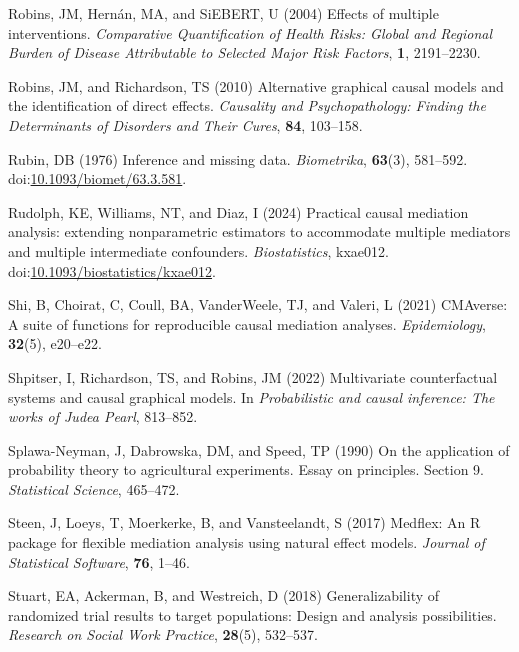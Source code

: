 \documentclass[
  single column]{article}
\newlength{\cslhangindent}
\newenvironment{CSLReferences}[2] %
 {\begin{list}{}{%
  \setlength{\itemindent}{0pt}
  \setlength{\leftmargin}{0pt}
  \setlength{\parsep}{0pt}
  \ifodd #1
   \setlength{\leftmargin}{\cslhangindent}
   \setlength{\itemindent}{-1\cslhangindent}
  \fi
  \setlength{\itemsep}{#2\baselineskip}}}
 {\end{list}}
\begin{document}
\begin{CSLReferences}{1}{0}
Robins, JM, Hernán, MA, and SiEBERT, U (2004) Effects of multiple
interventions. \emph{Comparative Quantification of Health Risks: Global
and Regional Burden of Disease Attributable to Selected Major Risk
Factors}, \textbf{1}, 2191--2230.

Robins, JM, and Richardson, TS (2010) Alternative graphical causal
models and the identification of direct effects. \emph{Causality and
Psychopathology: Finding the Determinants of Disorders and Their Cures},
\textbf{84}, 103--158.

Rubin, DB (1976) Inference and missing data. \emph{Biometrika},
\textbf{63}(3), 581--592.
doi:\href{https://doi.org/10.1093/biomet/63.3.581}{10.1093/biomet/63.3.581}.

Rudolph, KE, Williams, NT, and Diaz, I (2024) {Practical causal
mediation analysis: extending nonparametric estimators to accommodate
multiple mediators and multiple intermediate confounders}.
\emph{Biostatistics}, kxae012.
doi:\href{https://doi.org/10.1093/biostatistics/kxae012}{10.1093/biostatistics/kxae012}.

Shi, B, Choirat, C, Coull, BA, VanderWeele, TJ, and Valeri, L (2021)
CMAverse: A suite of functions for reproducible causal mediation
analyses. \emph{Epidemiology}, \textbf{32}(5), e20--e22.

Shpitser, I, Richardson, TS, and Robins, JM (2022) Multivariate
counterfactual systems and causal graphical models. In
\emph{Probabilistic and causal inference: The works of {J}udea {P}earl},
813--852.

Splawa-Neyman, J, Dabrowska, DM, and Speed, TP (1990) On the application
of probability theory to agricultural experiments. Essay on principles.
Section 9. \emph{Statistical Science}, 465--472.

Steen, J, Loeys, T, Moerkerke, B, and Vansteelandt, S (2017) Medflex: An
{R} package for flexible mediation analysis using natural effect models.
\emph{Journal of Statistical Software}, \textbf{76}, 1--46.

Stuart, EA, Ackerman, B, and Westreich, D (2018) Generalizability of
randomized trial results to target populations: Design and analysis
possibilities. \emph{Research on Social Work Practice}, \textbf{28}(5),
532--537.


\end{CSLReferences}
\end{document}
